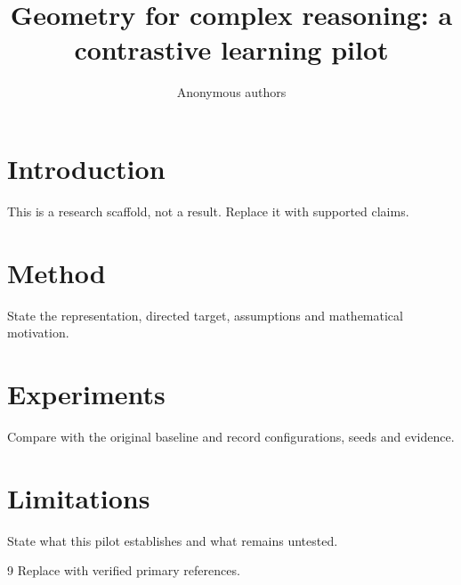 \documentclass{article}
\title{Geometry for complex reasoning: a contrastive learning pilot}
\author{Anonymous authors}
\begin{document}
\maketitle
\begin{abstract}

\end{abstract}
\section{Introduction}
This is a research scaffold, not a result. Replace it with supported claims.
\section{Method}
State the representation, directed target, assumptions and mathematical motivation.
\section{Experiments}
Compare with the original baseline and record configurations, seeds and evidence.
\section{Limitations}
State what this pilot establishes and what remains untested.
\label{crux:main-end}
\begin{thebibliography}{9}
 Replace with verified primary references.
\end{thebibliography}
\end{document}
